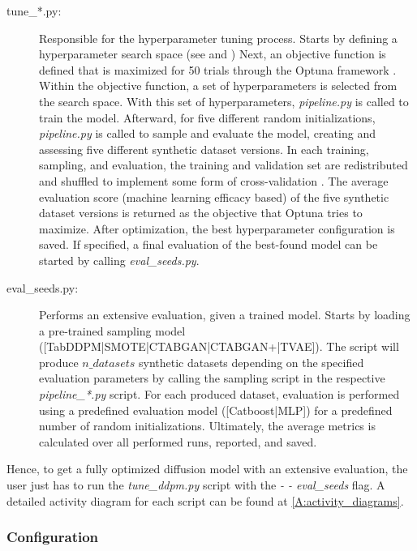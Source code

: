 \begin{description}
	\item[tune\_*.py\footnotemark:]
		Responsible for the hyperparameter tuning process.
		Starts by defining a hyperparameter search space (see \cite[Table 1, p. 4]{kotelnikov2022TabDDPMModellingTabular} and \cite[Table 7-11, p. 13 f.]{kotelnikov2022TabDDPMModellingTabular})
		Next, an objective function is defined that is maximized for 50 trials through the Optuna framework \cite{optuna_2019}.
		Within the objective function, a set of hyperparameters is selected from the search space.
		With this set of hyperparameters, \textit{pipeline.py} is called to train the model.
		Afterward, for five different random initializations, \textit{pipeline.py} is called to sample and evaluate the model, creating and assessing five different synthetic dataset versions.
		In each training, sampling, and evaluation, the training and validation set are redistributed and shuffled to implement some form of cross-validation \cite{kohavi2001StudyCrossValidationBootstrap}.
		The average evaluation score (machine learning efficacy based) of the five synthetic dataset versions is returned as the objective that Optuna tries to maximize.
		After optimization, the best hyperparameter configuration is saved.
		If specified, a final evaluation of the best-found model can be started by calling \textit{eval\_seeds.py}.
	\item[eval\_seeds.py:]
		Performs an extensive evaluation, given a trained model.
		Starts by loading a pre-trained sampling model \\([TabDDPM|SMOTE|CTABGAN|CTABGAN+|TVAE]).
		The script will produce $n\_datasets$ synthetic datasets depending on the specified evaluation parameters by calling the sampling script in the respective \textit{pipeline\_*.py} script.
		For each produced dataset, evaluation is performed using a predefined evaluation model ([Catboost|MLP]) for a predefined number of random initializations.
		Ultimately, the average metrics is calculated over all performed runs, reported, and saved.
\end{description}

Hence, to get a fully optimized diffusion model with an extensive evaluation, the user just has to run the \textit{tune\_ddpm.py} script with the \textit{- - eval\_seeds} flag.
A detailed activity diagram for each script can be found at \autoref{A:activity_diagrams}.

\subsubsection[]{Configuration}

